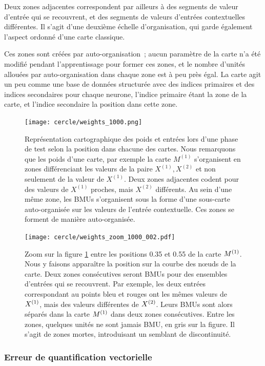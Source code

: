 \documentclass[../main]{subfiles}
\begin{document}
Deux zones adjacentes correspondent par ailleurs à des segments de valeur d'entrée qui se recouvrent, et des segments de valeurs d'entrées contextuelles différentes. 
Il s'agit d'une deuxième échelle d'organisation, qui garde également l'aspect ordonné d'une carte classique. 

Ces zones sont créées par auto-organisation~; aucun paramètre de la carte n'a été modifié pendant l'apprentissage pour former ces zones, et le nombre d'unités allouées par auto-organisation dans chaque zone est à peu près égal. La carte agit un peu comme une base de données structurée avec des indices primaires et des indices secondaires pour chaque neurone, l'indice primaire étant la zone de la carte, et l'indice secondaire la position dans cette zone.

\begin{figure}
	\centering\texttt{[image: cercle/weights\_1000.png]}
	\caption{Représentation cartographique des poids et entrées lors d'une phase de test selon la position dans chacune des cartes. Nous remarquons que les poids d'une carte, par exemple la carte $M^{(1)}$ s'organisent en zones différenciant les valeurs de la paire $X^{(1)}, X^{(2)}$ et non seulement de la valeur de $X^{(1)}$. Deux zones adjacentes codent pour des valeurs de $X^{(1)}$ proches, mais $X^{(2)}$ différents. Au sein d'une même zone, les BMUs s'organisent sous la forme d'une sous-carte auto-organisée sur les valeurs de l'entrée contextuelle. Ces zones se forment de manière auto-organisée. \label{fig:w}}
\end{figure}

\begin{figure}
	 \centering\texttt{[image: cercle/weights\_zoom\_1000\_002.pdf]}
	\caption{Zoom sur la figure \ref{fig:w} entre les positions 0.35 et 0.55 de la carte $M^{({1})}$. 
	Nous y faisons apparaître la position sur la courbe des n\oe{}uds de la carte.
	Deux zones consécutives seront BMUs pour des ensembles d'entrées qui se recouvrent. Par exemple, les deux entrées correspondant au points bleu et rouges ont les mêmes valeurs de $X^{({1})}$, mais des valeurs différentes de $X^{({2})}$. Leurs BMUs sont alors séparés dans la carte $M^{({1})}$ dans deux zones consécutives.
	Entre les zones, quelques unités ne sont jamais BMU, en gris sur la figure. Il s'agit de zones mortes, introduisant un semblant de discontinuité. 
	\label{fig:w_zoom}}
\end{figure}


\subsubsection{Erreur de quantification vectorielle}
\end{document}
